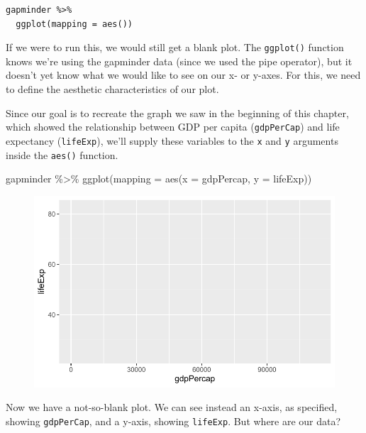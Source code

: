 \documentclass[
  letterpaper,
]{book}
\newenvironment{Shaded}{\begin{snugshade}}{\end{snugshade}}
\newcommand{\AttributeTok}[1]{\textcolor[rgb]{0.40,0.45,0.13}{#1}}
\newcommand{\FunctionTok}[1]{\textcolor[rgb]{0.28,0.35,0.67}{#1}}
\newcommand{\NormalTok}[1]{\textcolor[rgb]{0.00,0.23,0.31}{#1}}
\newcommand{\SpecialCharTok}[1]{\textcolor[rgb]{0.37,0.37,0.37}{#1}}
\begin{document}
\begin{verbatim}
gapminder %>%
  ggplot(mapping = aes())
\end{verbatim}

If we were to run this, we would still get a blank plot. The
\texttt{ggplot()} function knows we're using the gapminder data (since
we used the pipe operator), but it doesn't yet know what we would like
to see on our x- or y-axes. For this, we need to define the aesthetic
characteristics of our plot.

Since our goal is to recreate the graph we saw in the beginning of this
chapter, which showed the relationship between GDP per capita
(\texttt{gdpPerCap}) and life expectancy (\texttt{lifeExp}), we'll
supply these variables to the \texttt{x} and \texttt{y} arguments inside
the \texttt{aes()} function.

\begin{Shaded}
\begin{Highlighting}[]
\NormalTok{gapminder }\SpecialCharTok{\%\textgreater{}\%}
  \FunctionTok{ggplot}\NormalTok{(}\AttributeTok{mapping =} \FunctionTok{aes}\NormalTok{(}\AttributeTok{x =}\NormalTok{ gdpPercap, }
                       \AttributeTok{y =}\NormalTok{ lifeExp))}
\end{Highlighting}
\end{Shaded}

\begin{figure}[H]

{\centering \includegraphics{visualizing-with-ggplot_files/figure-pdf/unnamed-chunk-15-1.pdf}

}

\end{figure}

Now we have a not-so-blank plot. We can see instead an x-axis, as
specified, showing \texttt{gdpPerCap}, and a y-axis, showing
\texttt{lifeExp}. But where are our data?
\end{document}

